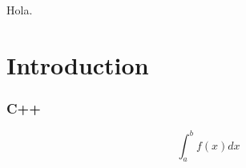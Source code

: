 \documentclass{scrreprt}
\begin{document}
Hola.

\chapter{Introduction}

\subsection{C++}

$$\int_a^b f(x)dx$$
\end{document}
